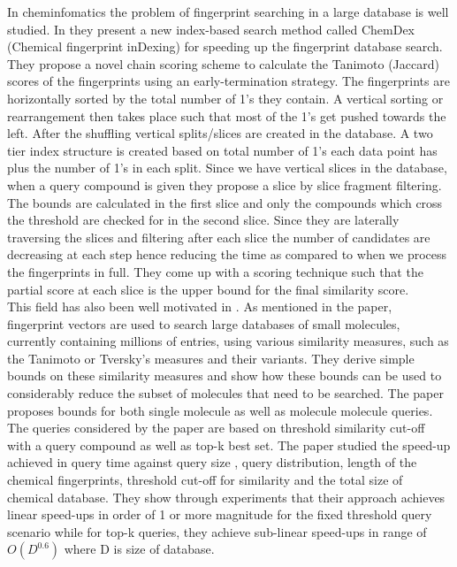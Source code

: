 
In cheminfomatics the problem of fingerprint searching in a large database is well studied. In \citet*{aung2010indexing} they present a new index-based search method called ChemDex (Chemical fingerprint inDexing) for speeding up the fingerprint database search. They propose a novel chain scoring scheme to calculate the Tanimoto (Jaccard) scores of the fingerprints using an early-termination strategy. The fingerprints are horizontally sorted by the total number of 1's they contain. A vertical sorting or rearrangement then takes place such that most of the 1's get pushed towards the left. After the shuffling vertical splits/slices are created in the database. A two tier index structure is created based on total number of 1's each data point has plus the number of 1's in each split. Since we have vertical slices in the database, when a query compound is given they propose a slice by slice fragment filtering. The bounds are calculated in the first slice and only the compounds which cross the threshold are checked for in the second slice. Since they are laterally traversing the slices and filtering after each slice the number of candidates are decreasing at each step hence reducing the time as compared to when we process the fingerprints in full. They come up with a scoring technique such that the partial score at each slice is the upper bound for the final similarity score.\\

This field has also been well motivated in \citet*{swamidass2007bounds}. As mentioned in the paper, fingerprint vectors are used to search large databases of small molecules, currently containing millions of entries, using various similarity measures, such as the Tanimoto or Tversky's measures and their variants. They derive simple bounds on these similarity measures and show how these bounds can be used to considerably reduce the subset of molecules that need to be searched. The paper proposes bounds for both single molecule as well as molecule molecule queries. The queries considered by the paper are based on threshold similarity cut-off with a query compound as well as top-k best set. The paper studied the speed-up achieved in query time against query size , query distribution, length of the chemical fingerprints, threshold cut-off for similarity and the total size of chemical database. They show through experiments that their approach achieves linear speed-ups in order of 1 or more magnitude for the fixed threshold query scenario while for top-k queries, they achieve sub-linear speed-ups in range of $O(D^{0.6})$ where D is size of database.\\

